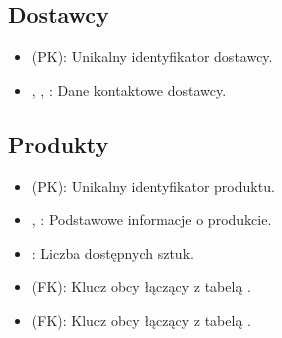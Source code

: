 \documentclass[a4paper,11pt,polish]{sphinxmanual}
\begin{document}
\subsection{Dostawcy}
\label{\detokenize{rozdzial_3:dostawcy}}\begin{description}
\begin{itemize}
\item {} 
\sphinxAtStartPar
{} (PK): Unikalny identyfikator dostawcy.

\item {} 
\sphinxAtStartPar
{}, , : Dane kontaktowe dostawcy.

\end{itemize}

\end{description}


\subsection{Produkty}
\label{\detokenize{rozdzial_3:produkty}}\begin{description}
\begin{itemize}
\item {} 
\sphinxAtStartPar
{} (PK): Unikalny identyfikator produktu.

\item {} 
\sphinxAtStartPar
{}, : Podstawowe informacje o produkcie.

\item {} 
\sphinxAtStartPar
{}: Liczba dostępnych sztuk.

\item {} 
\sphinxAtStartPar
{} (FK): Klucz obcy łączący z tabelą .

\item {} 
\sphinxAtStartPar
{} (FK): Klucz obcy łączący z tabelą .

\end{itemize}

\end{description}
\end{document}
